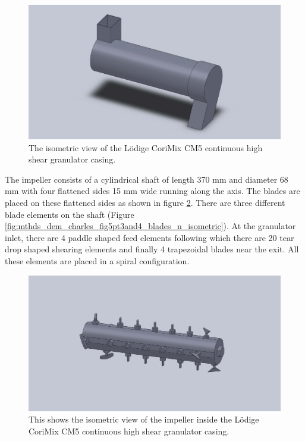 \documentclass[preprint,11pt,authoryear]{elsarticle}
\begin{document}
\begin{figure}
\centering
\includegraphics[scale=0.2]{shell_final_pic.pdf}
\caption{The isometric view of the L\"{o}dige CoriMix CM5 continuous high shear granulator casing.}
\label{fig:mthdsDemCharlesGranShell}
\end{figure}

The impeller consists of a cylindrical shaft of length 370 mm and diameter 68 mm with four 
flattened sides 15 mm wide running along the axis. The blades are placed on these flattened sides as 
shown in figure \ref{fig:mthds_dem_charles_impeller}. There are three different blade elements on the 
shaft (Figure \ref{fig:mthds_dem_charles_fig5pt3and4_blades_n_isometric}). At the granulator inlet, 
there are 4 paddle shaped feed elements following which there are 20 tear drop shaped shearing 
elements  and finally 4 trapezoidal blades near the exit. All these elements are placed in 
a spiral configuration. 

\begin{figure}
\centering
\includegraphics[scale=0.15]{impeller_final_pic.pdf}
\caption{This shows the isometric view of the impeller inside the L\"{o}dige CoriMix CM5 continuous 
high shear granulator casing.}
\label{fig:mthds_dem_charles_impeller}
\end{figure}    
\end{document}
